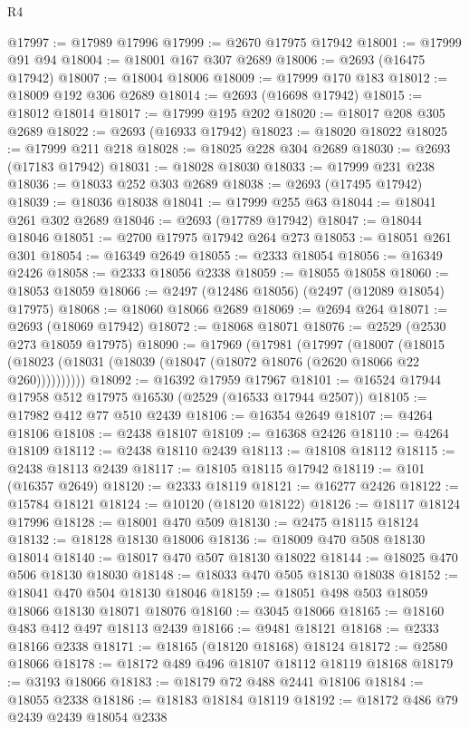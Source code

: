 \begin{lexlean}{R4}
\begin{coremodule}
@17997 := @17989 @17996
@17999 := @2670 @17975 @17942
@18001 := @17999 @91 @94
@18004 := @18001 @167 @307 @2689
@18006 := @2693 (@16475 @17942)
@18007 := @18004 @18006
@18009 := @17999 @170 @183
@18012 := @18009 @192 @306 @2689
@18014 := @2693 (@16698 @17942)
@18015 := @18012 @18014
@18017 := @17999 @195 @202
@18020 := @18017 @208 @305 @2689
@18022 := @2693 (@16933 @17942)
@18023 := @18020 @18022
@18025 := @17999 @211 @218
@18028 := @18025 @228 @304 @2689
@18030 := @2693 (@17183 @17942)
@18031 := @18028 @18030
@18033 := @17999 @231 @238
@18036 := @18033 @252 @303 @2689
@18038 := @2693 (@17495 @17942)
@18039 := @18036 @18038
@18041 := @17999 @255 @63
@18044 := @18041 @261 @302 @2689
@18046 := @2693 (@17789 @17942)
@18047 := @18044 @18046
@18051 := @2700 @17975 @17942 @264 @273
@18053 := @18051 @261 @301
@18054 := @16349 @2649
@18055 := @2333 @18054
@18056 := @16349 @2426
@18058 := @2333 @18056 @2338
@18059 := @18055 @18058
@18060 := @18053 @18059
@18066 := @2497 (@12486 @18056) (@2497 (@12089 @18054) @17975)
@18068 := @18060 @18066 @2689
@18069 := @2694 @264
@18071 := @2693 (@18069 @17942)
@18072 := @18068 @18071
@18076 := @2529 (@2530 @273 @18059 @17975)
@18090 := @17969
    (@17981
      (@17997
        (@18007
          (@18015 (@18023 (@18031 (@18039 (@18047 (@18072 @18076 (@2620 @18066 @22 @260))))))))))
@18092 := @16392 @17959 @17967
@18101 := @16524 @17944 @17958 @512 @17975 @16530 (@2529 (@16533 @17944 @2507))
@18105 := @17982 @412 @77 @510 @2439
@18106 := @16354 @2649
@18107 := @4264 @18106
@18108 := @2438 @18107
@18109 := @16368 @2426
@18110 := @4264 @18109
@18112 := @2438 @18110 @2439
@18113 := @18108 @18112
@18115 := @2438 @18113 @2439
@18117 := @18105 @18115 @17942
@18119 := @101 (@16357 @2649)
@18120 := @2333 @18119
@18121 := @16277 @2426
@18122 := @15784 @18121
@18124 := @10120 (@18120 @18122)
@18126 := @18117 @18124 @17996
@18128 := @18001 @470 @509
@18130 := @2475 @18115 @18124
@18132 := @18128 @18130 @18006
@18136 := @18009 @470 @508 @18130 @18014
@18140 := @18017 @470 @507 @18130 @18022
@18144 := @18025 @470 @506 @18130 @18030
@18148 := @18033 @470 @505 @18130 @18038
@18152 := @18041 @470 @504 @18130 @18046
@18159 := @18051 @498 @503 @18059 @18066 @18130 @18071 @18076
@18160 := @3045 @18066
@18165 := @18160 @483 @412 @497 @18113 @2439
@18166 := @9481 @18121
@18168 := @2333 @18166 @2338
@18171 := @18165 (@18120 @18168) @18124
@18172 := @2580 @18066
@18178 := @18172 @489 @496 @18107 @18112 @18119 @18168
@18179 := @3193 @18066
@18183 := @18179 @72 @488 @2441 @18106
@18184 := @18055 @2338
@18186 := @18183 @18184 @18119
@18192 := @18172 @486 @79 @2439 @2439 @18054 @2338

\end{coremodule}
\end{lexlean}
